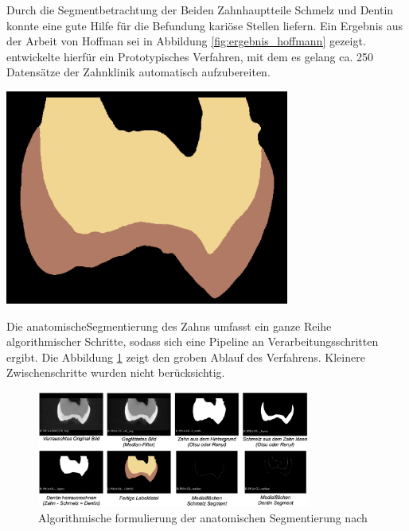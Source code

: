 \begin{minipage}{0.45\textwidth}
	Durch die Segmentbetrachtung der Beiden Zahnhauptteile Schmelz und Dentin konnte
	\citet{hoffmann2020} eine gute Hilfe für die Befundung kariöse Stellen liefern.
	Ein Ergebnis aus der Arbeit von Hoffman sei in Abbildung \ref{fig:ergebnis_hoffmann}
	gezeigt. \citet{hoffmann2020} entwickelte hierfür ein Prototypisches Verfahren,
	mit dem es gelang ca. 250 Datensätze der Zahnklinik automatisch aufzubereiten.
\end{minipage}
\hfill
\begin{minipage}{0.45\textwidth}
	\centering
	\includegraphics[width=0.7\textwidth]{img/ergebnis_hoffmann_2.jpg}
	\label{fig:ergebnis_hoffmann}
\end{minipage}

Die anatomischeSegmentierung des Zahns umfasst ein ganze Reihe algorithmischer
Schritte, sodass sich eine Pipeline an Verarbeitungsschritten ergibt. Die
Abbildung \ref{fig:anatomische_segmentierung} zeigt den groben Ablauf des
Verfahrens. Kleinere Zwischenschritte wurden nicht berücksichtig.

\begin{figure}[h]
	\centering
	\includegraphics[width=0.8\textwidth]{img/anatomischeSegmentierung.png}
	\caption{Algorithmische formulierung der anatomischen Segmentierung nach
	\citet{hoffmann2020}}
	\label{fig:anatomische_segmentierung}
\end{figure}

